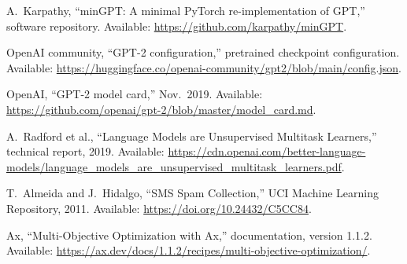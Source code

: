 A.~Karpathy, ``minGPT: A minimal PyTorch re-implementation of GPT,'' software repository.
Available: \url{https://github.com/karpathy/minGPT}.

OpenAI community, ``GPT-2 configuration,'' pretrained checkpoint configuration.
Available: \url{https://huggingface.co/openai-community/gpt2/blob/main/config.json}.

OpenAI, ``GPT-2 model card,'' Nov.~2019.
Available: \url{https://github.com/openai/gpt-2/blob/master/model_card.md}.

A.~Radford et al., ``Language Models are Unsupervised Multitask Learners,'' technical report, 2019.
Available: \url{https://cdn.openai.com/better-language-models/language_models_are_unsupervised_multitask_learners.pdf}.

T.~Almeida and J.~Hidalgo, ``SMS Spam Collection,'' UCI Machine Learning Repository, 2011.
Available: \url{https://doi.org/10.24432/C5CC84}.

Ax, ``Multi-Objective Optimization with Ax,'' documentation, version 1.1.2.
Available: \url{https://ax.dev/docs/1.1.2/recipes/multi-objective-optimization/}.

